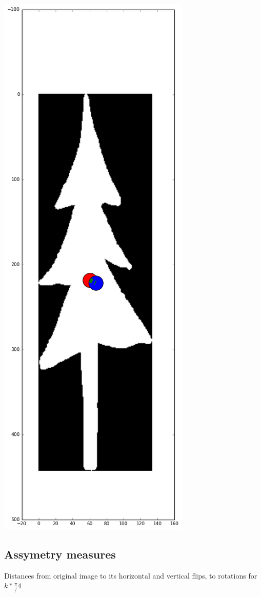 \documentclass[12pt]{article}
\begin{document}
\includegraphics[scale=0.26]{tree_centroid.png}

\subsection{Assymetry measures}
Distances from original image to its horizontal and vertical flips, to rotations for $k*\frac{\pi}/4$
 
\end{document}

